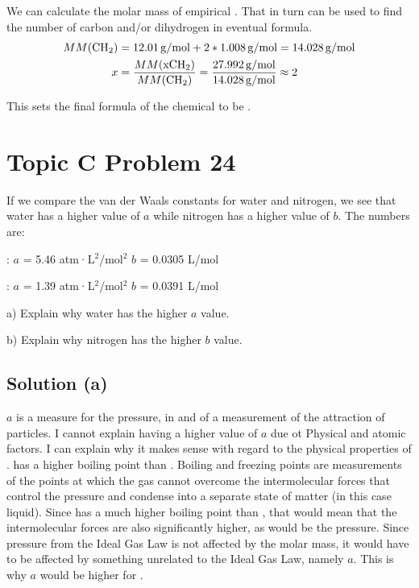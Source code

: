 \documentclass[10pt]{article}
\begin{document}
            We can calculate the molar mass of empirical . 
            That in turn can be used to find the number of carbon and/or dihydrogen in eventual formula.
            \begin{align}
                MM(\ce{CH2})    &=  12.01\,\unit{\gram/\mole} + 2 * 1.008\,\unit{\gram/\mole}
                    =   14.028\,\unit{\gram/\mole}\\
                x   &=  \frac{MM(\ce{xCH2})}{MM(\ce{CH2})}
                    =   \frac{27.992\,\unit{\gram/\mole}}{14.028\,\unit{\gram/\mole}}
                    \approx 2
            \end{align}

            This sets the final formula of the chemical to be . 

    \pagebreak
    \section{Topic C Problem 24}
        If we compare the van der Waals constants for water and nitrogen, we see that water has a higher value of $a$ while nitrogen has a higher value of $b$. 
        The numbers are:

        : $a$ = 5.46 atm·L$^2$/mol$^2$ $b$ = 0.0305 L/mol

        : $a$ = 1.39 atm·L$^2$/mol$^2$ $b$ = 0.0391 L/mol

        a) Explain why water has the higher $a$ value.

        b) Explain why nitrogen has the higher $b$ value.

        \subsection{Solution (a)}
            $a$ is a measure for the pressure, in and of a measurement of the attraction of particles. 
            I cannot explain  having a higher value of $a$ due ot Physical and atomic factors. 
            I can explain why it makes sense with regard to the physical properties of .
             has a higher boiling point than . 
            Boiling and freezing points are measurements of the points at which the gas cannot overcome the intermolecular forces that control the pressure and condense into a separate state of matter (in this case liquid).
            Since  has a much higher boiling point than , that would mean that the intermolecular forces are also significantly higher, as would be the pressure.
            Since pressure from the Ideal Gas Law is not affected by the molar mass, it would have to be affected by something unrelated to the Ideal Gas Law, namely $a$. 
            This is why $a$ would be higher for . 
\end{document}
